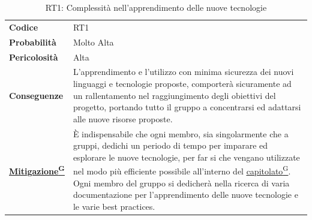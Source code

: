 \documentclass[a4paper,12pt]{article}
\providecommand{\glslink}[2]{\href{https://alittlebyte-19.github.io/Documentazione/glossario.html\#gls-#1}{\underline{#2}\textsuperscript{\scriptsize G}}}
\begin{document}
\begin{table}[h]
\begin{tabular}{>{\bfseries}p{3cm} | p{12.2cm}}
Codice & RT1 \\

Probabilità & Molto Alta\\

Pericolosità & Alta\\

Conseguenze & L'apprendimento e l'utilizzo con minima sicurezza dei nuovi linguaggi e tecnologie proposte, comporterà sicuramente ad un rallentamento nel raggiungimento degli obiettivi del progetto,
portando tutto il gruppo a concentrarsi ed adattarsi alle nuove risorse proposte. \\

\glslink{mitigazione-dei-rischi}{Mitigazione} & È indispensabile che ogni membro, sia singolarmente che a gruppi, dedichi un periodo di tempo per imparare ed esplorare le nuove tecnologie, per far si che vengano utilizzate nel modo più efficiente possibile all'interno del \glslink{capitolato}{capitolato}.
Ogni membro del gruppo si dedicherà nella ricerca di varia documentazione per l'apprendimento delle nuove tecnologie e le varie best practices.\\
\end{tabular}
\caption{RT1: Complessità nell'apprendimento delle nuove tecnologie}
\end{table}
\newpage
\end{document}
